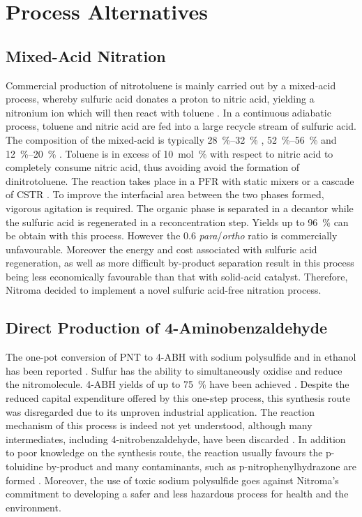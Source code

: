 \section{Process Alternatives}
\label{app:alternatives}

\subsection{Mixed-Acid Nitration}
Commercial production of nitrotoluene is mainly carried out by a mixed-acid process, whereby sulfuric acid donates a proton to nitric acid, yielding a nitronium ion which will then react with toluene \cite{halder_nitration_2007}. In a continuous adiabatic process, toluene and nitric acid are fed into a large recycle stream of sulfuric acid. The composition of the mixed-acid is typically \SIrange{28}{32}{\percent} , \SIrange{52}{56}{\percent}  and \SIrange{12}{20}{\percent}  \cite{dugal_nitrobenzene_2005}. Toluene is in excess of \SI{10}{mol\percent} with respect to nitric acid to completely consume nitric acid, thus avoiding avoid the formation of dinitrotoluene. The reaction takes place in a PFR with static mixers or a cascade of CSTR \cite{dugal_nitrobenzene_2005}. To improve the interfacial area between the two phases formed, vigorous agitation is required. The organic phase is separated in a decantor while the sulfuric acid is regenerated in a reconcentration step. Yields up to \SI{96}{\percent} can be obtain with this process. However the 0.6 \textit{para}/\textit{ortho} ratio is commercially unfavourable. Moreover the energy and cost associated with sulfuric acid regeneration, as well as more difficult by-product separation result in this process being less economically favourable than that with solid-acid catalyst. Therefore, Nitroma decided to implement a novel sulfuric acid-free nitration process.



\subsection{Direct Production of 4-Aminobenzaldehyde}
The one-pot conversion of PNT to 4-ABH with sodium polysulfide and  in ethanol has been reported \cite{ogata_mechanism_1979}. Sulfur has the ability to simultaneously oxidise and reduce the nitromolecule. 4-ABH yields of up to \SI{75}{\percent} have been achieved \cite{beard_preparation_1944}. Despite the reduced capital expenditure offered by this one-step process, this synthesis route was disregarded due to its unproven industrial application. The reaction mechanism of this process is indeed not yet understood, although many intermediates, including 4-nitrobenzaldehyde, have been discarded \cite{ogata_mechanism_1979}. In addition to poor knowledge on the synthesis route, the reaction usually favours the p-toluidine by-product and many contaminants, such as p-nitrophenylhydrazone are formed \cite{beard_preparation_1944}. Moreover, the use of toxic sodium polysulfide goes against Nitroma's commitment to developing a safer and less hazardous process for health and the environment.


